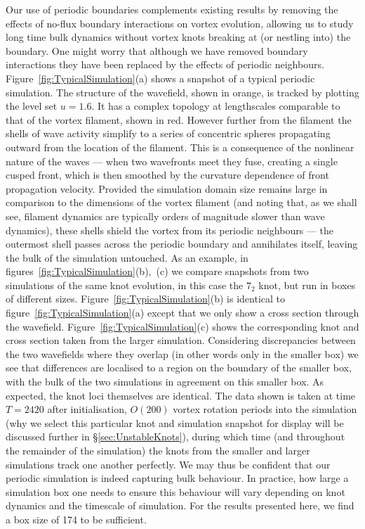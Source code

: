 Our use of periodic boundaries complements existing results by removing the effects of no-flux boundary interactions on vortex evolution, allowing us to study long time bulk dynamics without vortex knots breaking at (or nestling into) the boundary. One might worry that although we have removed boundary interactions they have been replaced by the effects of periodic neighbours. Figure~\ref{fig:TypicalSimulation}(a) shows a snapshot of a typical periodic simulation. The structure of the wavefield, shown in orange, is tracked by plotting the level set $u=1.6$. It has a complex topology at lengthscales comparable to that of the vortex filament, shown in red. However further from the filament the shells of wave activity simplify to a series of concentric spheres propagating outward from the location of the filament. This is a consequence of the nonlinear nature of the waves --- when two wavefronts meet they fuse, creating a single cusped front, which is then smoothed by the curvature dependence of front propagation velocity. Provided the simulation domain size remains large in comparison to the dimensions of the vortex filament (and noting that, as we shall see, filament dynamics are typically orders of magnitude slower than wave dynamics), these shells shield the vortex from its periodic neighbours --- the outermost shell passes across the periodic boundary and annihilates itself, leaving the bulk of the simulation untouched. As an example, in figures~\ref{fig:TypicalSimulation}(b),~(c) we compare snapshots from two simulations of the same knot evolution, in this case the $7_2$ knot, but run in boxes of different sizes. Figure~\ref{fig:TypicalSimulation}(b) is identical to figure~\ref{fig:TypicalSimulation}(a) except that we only show a cross section through the wavefield. Figure~\ref{fig:TypicalSimulation}(c) shows the corresponding knot and cross section taken from the larger simulation. Considering discrepancies between the two wavefields where they overlap (in other words only in the smaller box) we see that differences are localised to a region on the boundary of the smaller box, with the bulk of the two simulations in agreement on this smaller box. As expected, the knot loci themselves are identical. The data shown is taken at time $T=2420$ after initialisation, $O(200)$ vortex rotation periods into the simulation (why we select this particular knot and simulation snapshot for display will be discussed further in \S\ref{sec:UnstableKnots}), during which time (and throughout the remainder of the simulation) the knots from the smaller and larger simulations track one another perfectly. We may thus be confident that our periodic simulation is indeed capturing bulk behaviour. In practice, how large a simulation box one needs to ensure this behaviour will vary depending on knot dynamics and the timescale of simulation. For the results presented here, we find a box size of 174 to be sufficient. 

